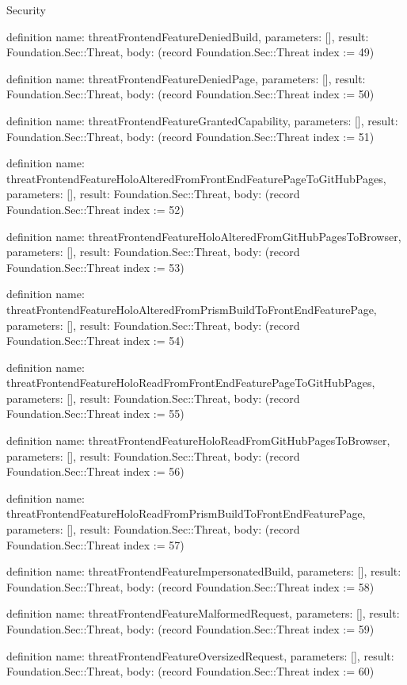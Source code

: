 \begin{lexlean}{Security}
\begin{semanticmodule}
definition{
  name: threatFrontendFeatureDeniedBuild,
  parameters: [],
  result: Foundation.Sec::Threat,
  body: (record Foundation.Sec::Threat {index := 49})
}

definition{
  name: threatFrontendFeatureDeniedPage,
  parameters: [],
  result: Foundation.Sec::Threat,
  body: (record Foundation.Sec::Threat {index := 50})
}

definition{
  name: threatFrontendFeatureGrantedCapability,
  parameters: [],
  result: Foundation.Sec::Threat,
  body: (record Foundation.Sec::Threat {index := 51})
}

definition{
  name: threatFrontendFeatureHoloAlteredFromFrontEndFeaturePageToGitHubPages,
  parameters: [],
  result: Foundation.Sec::Threat,
  body: (record Foundation.Sec::Threat {index := 52})
}

definition{
  name: threatFrontendFeatureHoloAlteredFromGitHubPagesToBrowser,
  parameters: [],
  result: Foundation.Sec::Threat,
  body: (record Foundation.Sec::Threat {index := 53})
}

definition{
  name: threatFrontendFeatureHoloAlteredFromPrismBuildToFrontEndFeaturePage,
  parameters: [],
  result: Foundation.Sec::Threat,
  body: (record Foundation.Sec::Threat {index := 54})
}

definition{
  name: threatFrontendFeatureHoloReadFromFrontEndFeaturePageToGitHubPages,
  parameters: [],
  result: Foundation.Sec::Threat,
  body: (record Foundation.Sec::Threat {index := 55})
}

definition{
  name: threatFrontendFeatureHoloReadFromGitHubPagesToBrowser,
  parameters: [],
  result: Foundation.Sec::Threat,
  body: (record Foundation.Sec::Threat {index := 56})
}

definition{
  name: threatFrontendFeatureHoloReadFromPrismBuildToFrontEndFeaturePage,
  parameters: [],
  result: Foundation.Sec::Threat,
  body: (record Foundation.Sec::Threat {index := 57})
}

definition{
  name: threatFrontendFeatureImpersonatedBuild,
  parameters: [],
  result: Foundation.Sec::Threat,
  body: (record Foundation.Sec::Threat {index := 58})
}

definition{
  name: threatFrontendFeatureMalformedRequest,
  parameters: [],
  result: Foundation.Sec::Threat,
  body: (record Foundation.Sec::Threat {index := 59})
}

definition{
  name: threatFrontendFeatureOversizedRequest,
  parameters: [],
  result: Foundation.Sec::Threat,
  body: (record Foundation.Sec::Threat {index := 60})
}


\end{semanticmodule}
\end{lexlean}
